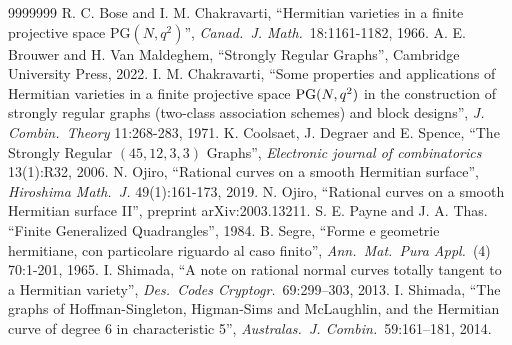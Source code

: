 \documentclass[11pt]{amsart}
\theoremstyle{plain} %
\theoremstyle{definition} %
\theoremstyle{remark} %
\begin{document}
\begin{thebibliography}{9999999}
 R. C. Bose and I. M. Chakravarti, ``Hermitian varieties in a finite projective space {\rm PG}$(N,q^2)$'', {\it Canad.\ J. Math.}\ 18:1161-1182, 1966.
 A. E. Brouwer and H. Van Maldeghem, ``Strongly Regular Graphs'', Cambridge University Press, 2022.
 I. M. Chakravarti, ``Some properties and applications of Hermitian varieties in a finite projective space ${\rm PG}(N,q^2)$ in the construction of strongly regular graphs (two-class association schemes) and block designs'', {\it J. Combin.\ Theory} 11:268-283, 1971.
 K. Coolsaet, J. Degraer and E. Spence, ``The Strongly Regular $(45,12,3,3)$ Graphs'', {\it Electronic journal of combinatorics} 13(1):R32, 2006. 
 N. Ojiro, ``Rational curves on a smooth Hermitian surface'', {\it Hiroshima Math.\ J.} 49(1):161-173, 2019.
 N. Ojiro, ``Rational curves on a smooth Hermitian surface II'',  preprint arXiv:2003.13211.
 S. E. Payne and J. A. Thas. ``Finite Generalized Quadrangles'', 1984.
 B. Segre, ``Forme e geometrie hermitiane, con particolare riguardo al caso finito'', {\it Ann.\ Mat.\ Pura Appl.}\ (4) 70:1-201, 1965.
 I. Shimada, ``A note on rational normal curves totally tangent to a Hermitian variety'', {\it Des.\ Codes Cryptogr.}\ 69:299–303, 2013.
 I. Shimada, ``The graphs of Hoffman-Singleton, Higman-Sims and McLaughlin, and the
Hermitian curve of degree 6 in characteristic 5'', {\it Australas.\ J. Combin.}\ 59:161–181, 2014.
\end{thebibliography}
\end{document}
